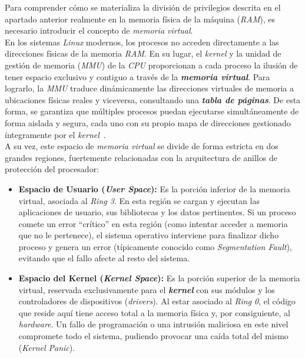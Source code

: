 Para comprender cómo se materializa la división de privilegios descrita en el apartado anterior realmente en la memoria física de la máquina (\textit{RAM}), es necesario introducir el concepto de \textit{memoria virtual}.\\

En los sistemas \textit{Linux} modernos, los procesos no acceden directamente a las direcciones físicas de la memoria \textit{RAM}.
En su lugar, el \textit{kernel} y la unidad de gestión de memoria (\textit{MMU}) de la \textit{CPU} proporcionan a cada proceso la ilusión de tener espacio exclusivo y contiguo a través de la \textbf{\textit{memoria virtual}}.
Para lograrlo, la \textit{MMU} traduce dinámicamente las direcciones virtuales de memoria a ubicaciones físicas reales y viceversa, consultando una \textbf{\textit{tabla de páginas}}.
De esta forma, se garantiza que múltiples procesos puedan ejecutarse simultáneamente de forma aislada y segura, cada uno con su propio mapa de direcciones gestionado íntegramente por el \textit{kernel}~\cite{silberschatz_memoria}.\\

A su vez, este espacio de \textit{memoria virtual} se divide de forma estricta en dos grandes regiones, fuertemente relacionadas con la arquitectura de anillos de protección del procesador:

\begin{itemize}
    \item \textbf{Espacio de Usuario (\textit{User Space}):} Es la porción inferior de la memoria virtual, asociada al \textit{Ring 3}. En esta región se cargan y ejecutan las aplicaciones de usuario, sus bibliotecas y los datos pertinentes.
    Si un proceso comete un error ``crítico'' en esta región (como intentar acceder a memoria que no le pertenece), el sistema operativo interviene para finalizar dicho proceso y genera un error (típicamente conocido como \textit{Segmentation Fault}), evitando que el fallo afecte al resto del sistema.
    \item \textbf{Espacio del Kernel (\textit{Kernel Space}):} Es la porción superior de la memoria virtual, reservada exclusivamente para el \textbf{\textit{kernel}} con sus módulos y los controladores de dispositivos (\textit{drivers}).
    Al estar asociado al \textit{Ring 0}, el código que reside aquí tiene acceso total a la memoria física y, por consiguiente, al \textit{hardware}. Un fallo de programación o una intrusión maliciosa en este nivel compromete todo el sistema, pudiendo provocar una caída total del mismo (\textit{Kernel Panic}).
\end{itemize}


